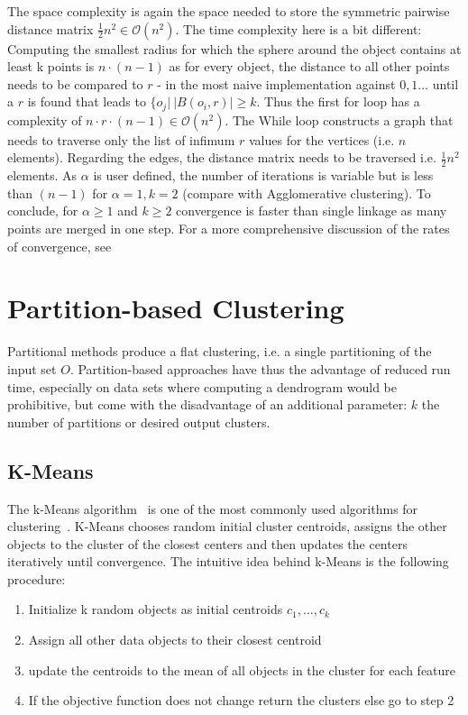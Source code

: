 The space complexity is again the space needed to store the symmetric pairwise distance matrix $\frac{1}{2}n^2 \in \mathcal{O}(n^2)$. The time complexity here is a bit different: Computing the smallest radius for which the sphere around the object contains at least k points is $n \cdot (n - 1)$ as for every object, the distance to all other points needs to be compared to $r$ - in the most naive implementation against $0, 1 \dots$ until a $r$ is found that leads to $\{o_j | \ |B(o_i, r)| \geq k$. Thus the first for loop has a complexity of $n \cdot r \cdot (n-1) \in \mathcal{O}(n^2)$. The While loop constructs a graph that needs to traverse only the list of infimum $r$ values for the vertices (i.e. $n$ elements). Regarding the edges, the distance matrix needs to be traversed i.e. $\frac{1}{2}n^2$ elements. As $\alpha$ is user defined, the number of iterations is variable but is less than $(n-1)$ for $\alpha = 1, k = 2$ (compare with Agglomerative clustering). To conclude, for $\alpha \geq 1$ and $k \geq 2$ convergence is faster than single linkage as many points are merged in one step. For a more comprehensive discussion of the rates of convergence, see~\cite{Chaudhuri2010RatesOC}



\section{Partition-based Clustering}\label{\positionnumber}
Partitional methods produce a flat clustering, i.e. a single partitioning of the input set $O$. Partition-based approaches have thus the advantage of reduced run time, especially on data sets where computing a dendrogram would be prohibitive, but come with the disadvantage of an additional parameter: $k$ the number of partitions or desired output clusters. 
\subsection{K-Means}\label{\positionnumber}
The k-Means algorithm~\cite{lloyd1982least, macqueen1967some} is one of the most commonly used algorithms for clustering~\cite{Jin2010}. K-Means chooses random initial cluster centroids, assigns the other objects to the cluster of the closest centers and then updates the centers iteratively until convergence. The intuitive idea behind k-Means is the following procedure: 
\begin{enumerate}
    \item Initialize k random objects as initial centroids $c_1, \dots, c_k$
    \item Assign all other data objects to their closest centroid
    \item update the centroids to the mean of all objects in the cluster for each feature
    \item If the objective function does not change return the clusters else go to step 2
\end{enumerate}

